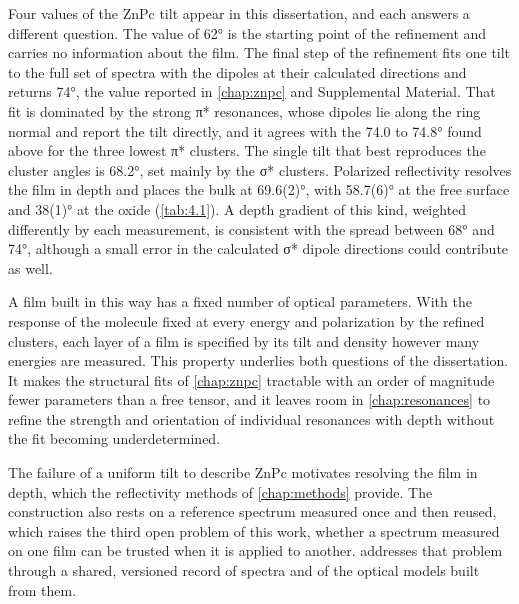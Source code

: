 Four values of the ZnPc tilt appear in this dissertation, and each answers a different question. The value of \ang{62} is the starting point of the refinement and carries no information about the film. The final step of the refinement fits one tilt to the full set of spectra with the dipoles at their calculated directions and returns \ang{74}, the value reported in \cref{chap:znpc} and Supplemental Material. That fit is dominated by the strong π* resonances, whose dipoles lie along the ring normal and report the tilt directly, and it agrees with the 74.0 to \ang{74.8} found above for the three lowest π* clusters. The single tilt that best reproduces the cluster angles is \ang{68.2}, set mainly by the σ* clusters. Polarized reflectivity resolves the film in depth and places the bulk at \ang{69.6(2)}, with \ang{58.7(6)} at the free surface and \ang{38(1)} at the oxide (\cref{tab:4.1}). A depth gradient of this kind, weighted differently by each measurement, is consistent with the spread between \ang{68} and \ang{74}, although a small error in the calculated σ* dipole directions could contribute as well.

A film built in this way has a fixed number of optical parameters. With the response of the molecule fixed at every energy and polarization by the refined clusters, each layer of a film is specified by its tilt and density however many energies are measured. This property underlies both questions of the dissertation. It makes the structural fits of \cref{chap:znpc} tractable with an order of magnitude fewer parameters than a free tensor, and it leaves room in \cref{chap:resonances} to refine the strength and orientation of individual resonances with depth without the fit becoming underdetermined.

The failure of a uniform tilt to describe ZnPc motivates resolving the film in depth, which the reflectivity methods of \cref{chap:methods} provide. The construction also rests on a reference spectrum measured once and then reused, which raises the third open problem of this work, whether a spectrum measured on one film can be trusted when it is applied to another.  addresses that problem through a shared, versioned record of spectra and of the optical models built from them.

